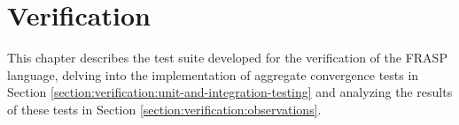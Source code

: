 
\chapter{Verification}
\label{chapter:verification}

This chapter describes the test suite developed for the verification of the
FRASP language, delving into the implementation of aggregate convergence tests
in Section \ref{section:verification:unit-and-integration-testing} and
analyzing the results of these tests in Section
\ref{section:verification:observations}.


